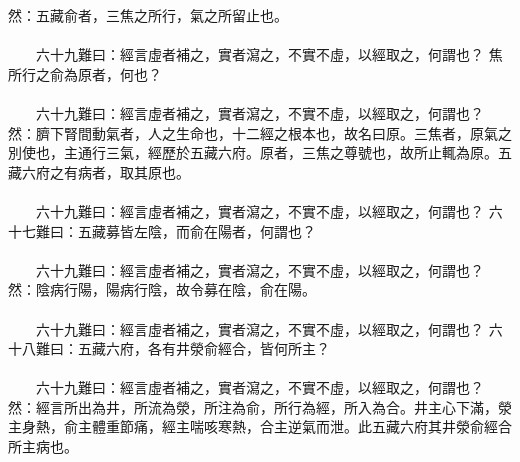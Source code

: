 然：五藏俞者，三焦之所行，氣之所留止也。
\\\\
　　六十九難曰：經言虛者補之，實者瀉之，不實不虛，以經取之，何謂也？
焦所行之俞為原者，何也？
\\\\
　　六十九難曰：經言虛者補之，實者瀉之，不實不虛，以經取之，何謂也？
然：臍下腎間動氣者，人之生命也，十二經之根本也，故名曰原。三焦者，原氣之別使也，主通行三氣，經歷於五藏六府。原者，三焦之尊號也，故所止輒為原。五藏六府之有病者，取其原也。
\\\\
　　六十九難曰：經言虛者補之，實者瀉之，不實不虛，以經取之，何謂也？
六十七難曰：五藏募皆左陰，而俞在陽者，何謂也？
\\\\
　　六十九難曰：經言虛者補之，實者瀉之，不實不虛，以經取之，何謂也？
然：陰病行陽，陽病行陰，故令募在陰，俞在陽。
\\\\
　　六十九難曰：經言虛者補之，實者瀉之，不實不虛，以經取之，何謂也？
六十八難曰：五藏六府，各有井滎俞經合，皆何所主？
\\\\
　　六十九難曰：經言虛者補之，實者瀉之，不實不虛，以經取之，何謂也？
然：經言所出為井，所流為滎，所注為俞，所行為經，所入為合。井主心下滿，滎主身熱，俞主體重節痛，經主喘咳寒熱，合主逆氣而泄。此五藏六府其井滎俞經合所主病也。